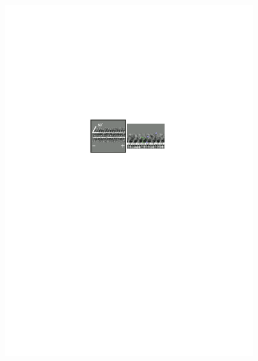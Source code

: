 \documentclass[9pt,twocolumn,twoside,lineno]{pnas-new}
\begin{document}
\begin{figure}
\begin{minipage}{\textwidth}
   \includegraphics[width=\linewidth]{figures/schematic-binding-angle}
   \label{fig:bindingangle}
 \end{minipage}
 \begin{minipage}{\textwidth}
   \centering

\end{minipage}
\end{figure}
\end{document}
